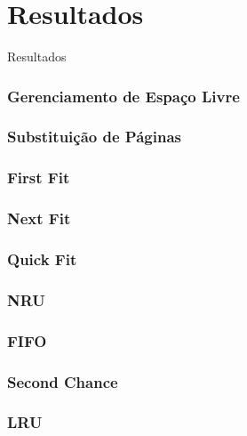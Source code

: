 \documentclass{beamer}
\begin{document}
\section{Resultados} 
\begin{frame}
\begin{LARGE}
\begin{center}
Resultados
\end{center}
\end{LARGE}
\end{frame}


\begin{frame}
\frametitle{Gerenciamento de Espaço Livre} 
\justifying
\end{frame}

\begin{frame}
\frametitle{Substituição de Páginas} 
\justifying
\end{frame}

\begin{frame}
\frametitle{First Fit} 
\justifying
\end{frame}

\begin{frame}
\frametitle{Next Fit} 
\justifying
\end{frame}

\begin{frame}
\frametitle{Quick Fit} 
\justifying
\end{frame}


\begin{frame}
\frametitle{NRU} 
\justifying
\end{frame}

\begin{frame}
\frametitle{FIFO} 
\justifying
\end{frame}

\begin{frame}
\frametitle{Second Chance} 
\justifying
\end{frame}

\begin{frame}
\frametitle{LRU} 
\justifying
\end{frame}
\end{document}
